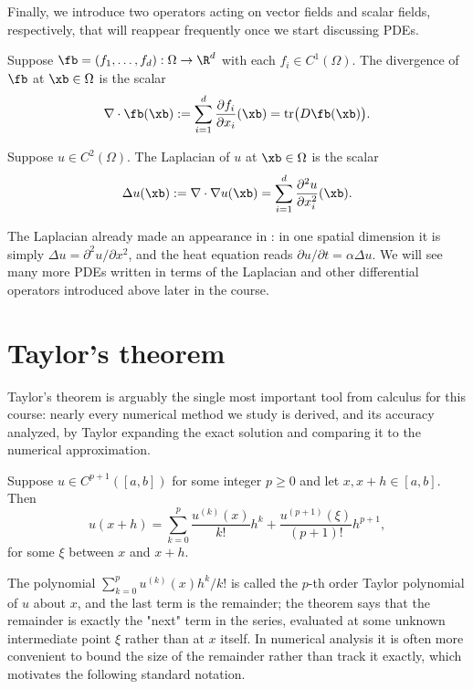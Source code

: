 Finally, we introduce two operators acting on vector fields and scalar
fields, respectively, that will reappear frequently once we start
discussing PDEs.

\begin{definition}[Divergence]
    Suppose $\fb = (f_1, \ldots, f_d): \Omega \to \R^d$ with each $f_i
    \in C^1(\Omega)$. The divergence of $\fb$ at $\xb \in \Omega$ is the
    scalar
    \begin{equation*}
        \nabla \cdot \fb(\xb) :=
        \sum_{i=1}^d \frac{\partial f_i}{\partial x_i}(\xb) =
        \mathrm{tr}\big(D\fb(\xb)\big).
    \end{equation*}
\end{definition}

\begin{definition}[Laplacian]
    Suppose $u \in C^2(\Omega)$. The Laplacian of $u$ at $\xb \in
    \Omega$ is the scalar
    \begin{equation*}
        \Delta u(\xb) := \nabla \cdot \nabla u(\xb) =
        \sum_{i=1}^d \frac{\partial^2 u}{\partial x_i^2}(\xb).
    \end{equation*}
\end{definition}
The Laplacian already made an appearance in : in
one spatial dimension it is simply $\Delta u = \partial^2 u/\partial
x^2$, and the heat equation reads $\partial u/\partial t = \alpha \Delta
u$. We will see many more PDEs written in terms of the Laplacian and
other differential operators introduced above later in the course.


\section{Taylor's theorem}

Taylor's theorem is arguably the single most important tool from
calculus for this course: nearly every numerical method we study is
derived, and its accuracy analyzed, by Taylor expanding the exact
solution and comparing it to the numerical approximation.

\begin{theorem}
    \label{thm:taylor-1d}
    Suppose $u \in C^{p+1}([a,b])$ for some integer $p \ge 0$ and let
    $x, x+h \in [a,b]$. Then
    \begin{equation*}
        u(x+h) = \sum_{k=0}^p \frac{u^{(k)}(x)}{k!} h^k +
        \frac{u^{(p+1)}(\xi)}{(p+1)!} h^{p+1},
    \end{equation*}
    for some $\xi$ between $x$ and $x+h$.
\end{theorem}
The polynomial $\sum_{k=0}^p u^{(k)}(x) h^k / k!$ is called the $p$-th
order Taylor polynomial of $u$ about $x$, and the last term is the
remainder; the theorem says that the remainder is exactly the "next"
term in the series, evaluated at some unknown intermediate point $\xi$
rather than at $x$ itself. In numerical analysis it is often more
convenient to bound the size of the remainder rather than track it
exactly, which motivates the following standard notation.

